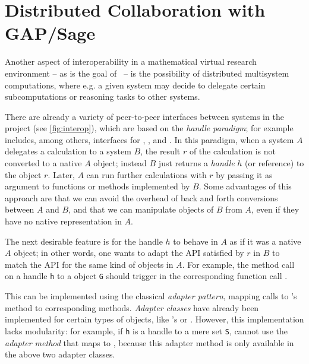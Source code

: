\section{Distributed Collaboration with GAP/Sage}\label{sec:gapsage}
\label{sec:handles}

Another aspect of interoperability in a mathematical virtual research environment -- as is the goal of \ODK\ -- is the possibility
of distributed multisystem computations, where e.g. a given system
may decide to delegate certain subcomputations or reasoning tasks to other systems.

There are already a variety of peer-to-peer interfaces between systems
in the \ODK project (see \autoref{fig:interop}), which are based on
the \emph{handle paradigm}; for example \Sage includes, among others,
interfaces for \GAP, \Singular, and \Pari.
%
In this paradigm, when a system $A$ delegates a calculation to a system $B$, the
result $r$ of the calculation is not converted to a native $A$ object; instead $B$ just
returns a \emph{handle} $h$ (or reference) to the object $r$. Later, $A$ can run further
calculations with $r$ by passing it as argument to functions or methods implemented by $B$.
Some advantages of this approach are that we can avoid the overhead of back and forth
conversions between $A$ and $B$, and that we can manipulate objects of $B$ from $A$, even
if they have no native representation in $A$.

The next desirable feature is for the handle $h$ to behave in $A$ as
if it was a native $A$ object; in other words, one wants to adapt the API
satisfied by $r$ in $B$ to match the API for the same kind of objects
in $A$. For example, the method call  on a
\Sage handle \texttt{h} to a \GAP object \texttt{G} should trigger in
\GAP the corresponding function call .

This can be implemented using the classical \emph{adapter
  pattern}, mapping calls to \Sage's method to corresponding \GAP
methods. \emph{Adapter classes} have already been implemented for
certain types of objects, like \Sage's  or
. However, this implementation lacks modularity:
for example, if \texttt{h} is a handle to a mere set \texttt{S}, \Sage
cannot use the \emph{adapter method} that maps
 to , because this adapter
method is only available in the above two adapter classes.

